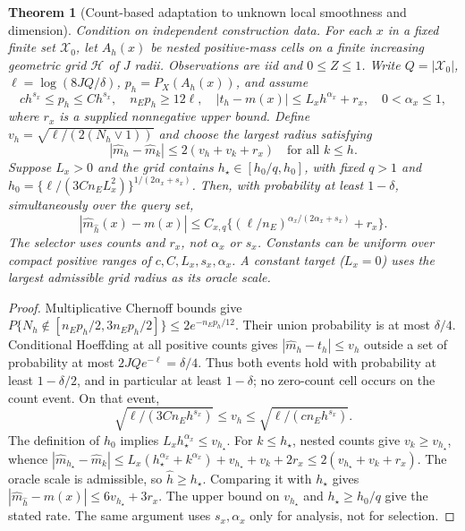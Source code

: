 \documentclass[11pt,a4paper]{article}
\numberwithin{equation}{section}
\newtheorem{theorem}{Theorem}[section]
\theoremstyle{definition}\newtheorem{definition}[theorem]{Definition}
\theoremstyle{remark}\newtheorem{remark}[theorem]{Remark}
\begin{document}
\begin{theorem}[Count-based adaptation to unknown local smoothness and dimension]\label{thm:adaptive}
Condition on independent construction data. For each $x$ in a fixed finite set
$\mathcal X_0$, let $A_h(x)$ be nested positive-mass cells on a finite increasing
geometric grid $\mathcal H$ of $J$ radii. Observations are iid and $0\le Z\le1$.
Write $Q=|\mathcal X_0|$, $\ell=\log(8JQ/\delta)$, $p_h=P_X(A_h(x))$, and assume
\[
 c h^{s_x}\le p_h\le C h^{s_x},\quad n_Ep_h\ge12\ell,
 \quad |t_h-m(x)|\le L_xh^{\alpha_x}+r_x,
 \quad 0<\alpha_x\le1,
\]
where $r_x$ is a supplied nonnegative upper bound. Define
$v_h=\sqrt{\ell/(2(N_h\vee1))}$ and choose the largest radius satisfying
\[
 |\widehat m_h-\widehat m_k|\le2(v_h+v_k+r_x)\quad\text{for all }k\le h.
\]
Suppose $L_x>0$ and the grid contains $h_\star\in[h_0/q,h_0]$, with fixed $q>1$ and
$h_0=\{\ell/(3Cn_EL_x^2)\}^{1/(2\alpha_x+s_x)}$.
Then, with probability at least $1-\delta$, simultaneously over the query set,
\[
 |\widehat m_{\widehat h}(x)-m(x)|
 \le C_{x,q}\{(\ell/n_E)^{\alpha_x/(2\alpha_x+s_x)}+r_x\}.
\]
The selector uses counts and $r_x$, not $\alpha_x$ or $s_x$. Constants can be
uniform over compact positive ranges of $c,C,L_x,s_x,\alpha_x$. A constant target
($L_x=0$) uses the largest admissible grid radius as its oracle scale.
\end{theorem}
\begin{proof}
Multiplicative Chernoff bounds give
$P\{N_h\notin[n_Ep_h/2,3n_Ep_h/2]\}\le2e^{-n_Ep_h/12}$.
Their union probability is at most $\delta/4$. Conditional Hoeffding at all
positive counts gives $|\widehat m_h-t_h|\le v_h$ outside a set of probability
at most $2JQe^{-\ell}=\delta/4$. Thus both events hold with probability at least
$1-\delta/2$, and in particular at least $1-\delta$; no zero-count cell occurs
on the count event. On that event,
\[
 \sqrt{\ell/(3Cn_Eh^{s_x})}\le v_h
 \le\sqrt{\ell/(cn_Eh^{s_x})}.
\]
The definition of $h_0$ implies $L_xh_\star^{\alpha_x}\le v_{h_\star}$.
For $k\le h_\star$, nested counts give $v_k\ge v_{h_\star}$, whence
$|\widehat m_{h_\star}-\widehat m_k|
\le L_x(h_\star^{\alpha_x}+k^{\alpha_x})+v_{h_\star}+v_k+2r_x
\le2(v_{h_\star}+v_k+r_x)$.
The oracle scale is admissible, so $\widehat h\ge h_\star$.
Comparing it with $h_\star$ gives
$|\widehat m_{\widehat h}-m(x)|\le6v_{h_\star}+3r_x$.
The upper bound on $v_{h_\star}$ and $h_\star\ge h_0/q$ give the stated
rate. The same argument uses $s_x,\alpha_x$ only for analysis, not for selection.
\end{proof}
\end{document}
